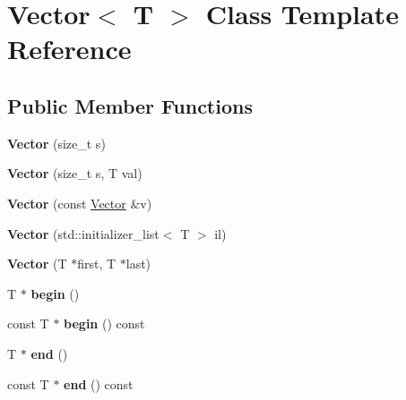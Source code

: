 \hypertarget{class_vector}{}\section{Vector$<$ T $>$ Class Template Reference}
\label{class_vector}
\subsection*{Public Member Functions}
\begin{DoxyCompactItemize}
\item 
\mbox{\label{class_vector_a1f84f7521359467a5a2e87c79a9f939c}} 
{\bfseries Vector} (size\+\_\+t s)
\item 
\mbox{\label{class_vector_aa0bc466e7c4b1bf1a0919dc47e7ea8d5}} 
{\bfseries Vector} (size\+\_\+t s, T val)
\item 
\mbox{\label{class_vector_a83ed77764ab028ba5f5177a5926effa7}} 
{\bfseries Vector} (const \mbox{\hyperlink{class_vector}{Vector}} \&v)
\item 
\mbox{\label{class_vector_a12f4ef4ad1278a19dd88da6696630821}} 
{\bfseries Vector} (std\+::initializer\+\_\+list$<$ T $>$ il)
\item 
\mbox{\label{class_vector_a8ff53e4f44bef6265995fe49ad0a2c7a}} 
{\bfseries Vector} (T $\ast$first, T $\ast$last)
\item 
\mbox{\label{class_vector_a04d75bb842e6b536f697f0aa5b929d98}} 
T $\ast$ {\bfseries begin} ()
\item 
\mbox{\label{class_vector_a3fe321be4cbad96c9f769f52ce816d63}} 
const T $\ast$ {\bfseries begin} () const
\item 
\mbox{\label{class_vector_a7b8b8655aa04ee8141fe3fdac7343619}} 
T $\ast$ {\bfseries end} ()
\item 
\mbox{\label{class_vector_ab0237ecece8f433f6f7d146763b6ce68}} 
const T $\ast$ {\bfseries end} () const
\item 
\mbox{\label{class_vector_aa9f7512ab21b66f86a113dd7709a03be}} 

\end{DoxyCompactItemize}
